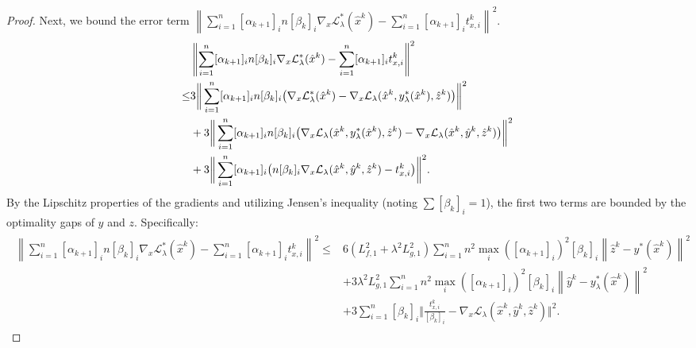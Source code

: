 \documentclass{article}
\theoremstyle{plain}
\theoremstyle{definition}
\theoremstyle{remark}
\begin{document}
\begin{proof}
	 Next, we bound the error term $\left\|\sum_{i=1}^{n}[\alpha_{k+1}]_{i} n[\beta_{k}]_{i}\nabla_{x}\mathcal{L}_{\lambda}^{*}(\hat{x}^{k})-\sum_{i=1}^n[\alpha_{k+1}]_it_{x,i}^k\right\|^{2}$. 
	\begin{align}
		&\left\|\sum_{i=1}^{n}[\alpha_{k+1}]_{i} n[\beta_{k}]_{i}\nabla_{x}\mathcal{L}_{\lambda}^{*}(\hat{x}^{k})-\sum_{i=1}^n[\alpha_{k+1}]_it_{x,i}^k\right\|^{2} \notag\\
		\leq
		&3\bigg\Vert\sum_{i=1}^n[\alpha_{k+1}]_i n[\beta_{k}]_i\big(\nabla_{x}\mathcal{L}_{\lambda}^{*}(\hat{x}^{k})-\nabla_{x}\mathcal{L}_{\lambda}(\hat{x}^{k}, y_{\lambda}^{*}(\hat{x}^{k}), \hat{z}^{k})\big)\bigg\Vert^2 \notag\\
        &+3\bigg\Vert\sum_{i=1}^n[\alpha_{k+1}]_i n[\beta_{k}]_i\big(\nabla_{x}\mathcal{L}_{\lambda}(\hat{x}^{k}, y_{\lambda}^{*}(\hat{x}^{k}), \hat{z}^{k})-\nabla_{x}\mathcal{L}_{\lambda}(\hat{x}^{k}, \hat{y}^{k}, \hat{z}^{k})\big)\bigg\Vert^2 \notag\\
        &+3\bigg\Vert\sum_{i=1}^n[\alpha_{k+1}]_i\big( n[\beta_{k}]_i \nabla_{x}\mathcal{L}_{\lambda}(\hat{x}^{k}, \hat{y}^{k}, \hat{z}^{k}) -  t_{x,i}^k\big)\bigg\Vert^2 \notag.
	\end{align}
By the Lipschitz properties of the gradients and utilizing Jensen's inequality (noting  $\sum [\beta_k]_i = 1$), the first two terms are bounded by the optimality gaps of $y$ and $z$. Specifically:
    	\begin{align}\label{opt_Lag_de_2}
        \begin{aligned}
		\left\|\sum_{i=1}^{n}[\alpha_{k+1}]_{i} n[\beta_{k}]_{i}\nabla_{x}\mathcal{L}_{\lambda}^{*}(\hat{x}^{k})-\sum_{i=1}^n[\alpha_{k+1}]_it_{x,i}^k\right\|^{2}
		\leq
		&6(L_{f,1}^{2}+\lambda^{2}L_{g,1}^{2})\sum_{i=1}^{n} n^2\max_{i}([\alpha_{k+1}]_{i})^{2}[\beta_{k}]_{i}\left\|\hat{z}^{k}-y^*(\hat{x}^{k})\right\|^{2}\\
        &+3\lambda^{2}L_{g,1}^{2}\sum_{i=1}^{n}n^2\max_{i}([\alpha_{k+1}]_{i})^{2}[\beta_{k}]_{i}\left\|\hat{y}^{k}-y_{\lambda}^*(\hat{x}^{k})\right\|^{2} \\
		&+3\sum_{i=1}^n[\beta_{k}]_i\bigg\Vert\frac{t_{x,i}^k}{[\beta_{k}]_i}-\nabla_{x}\mathcal{L}_{\lambda}(\hat{x}^{k}, \hat{y}^{k}, \hat{z}^{k}) \bigg\Vert^2 .
         \end{aligned}

\end{align}
\end{proof}
\end{document}
